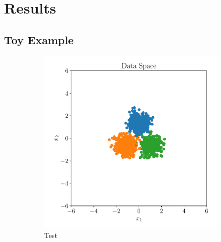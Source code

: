\chapter{Results}%
\label{cha:results}


\section{Toy Example}%
\label{sec:toy_example}

\begin{figure}[htpb] \centering
    \begin{subfigure}[]{0.4\textwidth}
        \centering
    \includegraphics[width=\linewidth]{figures/toy_example/gaussian_mixture/toy_data.pdf}
        \caption{Test}
        \label{fig:gmm_sample_space}
    \end{subfigure}
    \begin{subfigure}[]{0.4\textwidth}
        \centering

\end{subfigure}
\end{figure}
